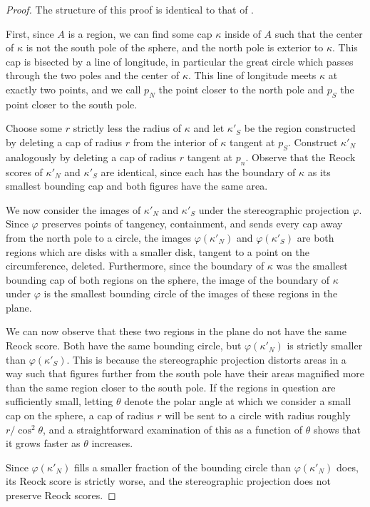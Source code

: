\begin{proof}

  The structure of this proof is identical to that of
  .

  First, since $A$ is a region, we can find some cap $\kappa$ inside
  of $A$ such that the center of $\kappa$ is not the south pole of the
  sphere, and the north pole is exterior to $\kappa$.  This cap is
  bisected by a line of longitude, in particular the great circle
  which passes through the two poles and the center of $\kappa$.  This
  line of longitude meets $\kappa$ at exactly two points, and we call
  $p_N$ the point closer to the north pole and $p_S$ the point closer
  to the south pole.

  Choose some $r$ strictly less the radius of $\kappa$ and let
  $\kappa'_S$ be the region constructed by deleting a cap of radius
  $r$ from the interior of $\kappa$ tangent at $p_S$.  Construct
  $\kappa'_N$ analogously by deleting a cap of radius $r$ tangent at
  $p_n$. Observe that the Reock scores of $\kappa'_N$ and $\kappa'_S$
  are identical, since each has the boundary of $\kappa$ as its
  smallest bounding cap and both figures have the same area.

  We now consider the images of $\kappa'_N$ and $\kappa'_S$ under the
  stereographic projection $\varphi$.  Since $\varphi$ preserves
  points of tangency, containment, and sends every cap away from the
  north pole to a circle, the images $\varphi(\kappa'_N)$ and
  $\varphi(\kappa'_S)$ are both regions which are disks with a smaller
  disk, tangent to a point on the circumference, deleted.
  Furthermore, since the boundary of $\kappa$ was the smallest
  bounding cap of both regions on the sphere, the image of the
  boundary of $\kappa$ under $\varphi$ is the smallest bounding circle
  of the images of these regions in the plane.

  We can now observe that these two regions in the plane do not have
  the same Reock score.  Both have the same bounding circle, but
  $\varphi(\kappa'_N)$ is strictly smaller than $\varphi(\kappa'_S)$.
  This is because the stereographic projection distorts areas in a way
  such that figures further from the south pole have their areas
  magnified more than the same region closer to the south pole.  If
  the regions in question are sufficiently small, letting $\theta$
  denote the polar angle at which we consider a small cap on the
  sphere, a cap of radius $r$ will be sent to a circle with radius
  roughly $r/\cos^2{\theta}$, and a straightforward
  examination of this as a function of $\theta$ shows that it grows
  faster as $\theta$ increases.

  Since $\varphi(\kappa'_N)$ fills a smaller fraction of the bounding
  circle than $\varphi(\kappa'_N)$ does, its Reock score is strictly
  worse, and the stereographic projection does not preserve Reock
  scores.
\end{proof}
